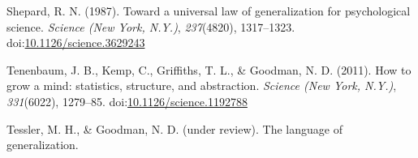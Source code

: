 \documentclass[floatsintext,doc]{apa6}
\theoremstyle{definition}
\theoremstyle{definition}
\theoremstyle{definition}
\theoremstyle{remark}
\begin{document}
\hypertarget{ref-Shepard1987}{}
Shepard, R. N. (1987). Toward a universal law of generalization for
psychological science. \emph{Science (New York, N.Y.)},
\emph{237}(4820), 1317--1323.
doi:\href{https://doi.org/10.1126/science.3629243}{10.1126/science.3629243}

\hypertarget{ref-Tenenbaum2011}{}
Tenenbaum, J. B., Kemp, C., Griffiths, T. L., \& Goodman, N. D. (2011).
How to grow a mind: statistics, structure, and abstraction.
\emph{Science (New York, N.Y.)}, \emph{331}(6022), 1279--85.
doi:\href{https://doi.org/10.1126/science.1192788}{10.1126/science.1192788}

\hypertarget{ref-TesslerLangGenUnderReview}{}
Tessler, M. H., \& Goodman, N. D. (under review). The language of
generalization.
\end{document}
